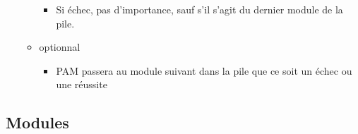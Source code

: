 \documentclass[a4paper]{article}
\begin{document}
\begin{itemize}[label = \textbullet, font = \Large]
\begin{itemize}[label=, font=\scriptsize]
\begin{itemize}
            \item Si échec, pas d’importance, sauf s’il s’agit du dernier module de la pile.
          \end{itemize}
          \item optionnal
          \begin{itemize}
            \item  PAM passera au
            module suivant dans la pile que ce soit un échec ou une réussite
          \end{itemize}
        \end{itemize}
      \end{itemize}

      \subsection{Modules}
\end{document}
